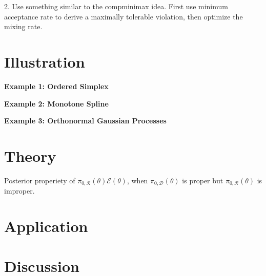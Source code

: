 \documentclass[10pt]{article}
\newcommand{\mc}[1]{\mathcal{#1}}
\begin{document}
2. Use something similar to the compminimax idea. First use minimum acceptance rate to derive a maximally tolerable violation, then optimize the mixing rate. 


\section{Illustration}

{\bf Example 1: Ordered Simplex}

{\bf Example 2: Monotone Spline} 

{\bf Example 3: Orthonormal Gaussian Processes} 

\section{Theory}

Posterior properiety of $\pi_{0,\mc R}(\theta) \mc E(\theta)$,  when $\pi_{0,\mc D}(\theta)$ is proper but $\pi_{0,\mc R}(\theta)$ is improper. 

\section{Application}
\section{Discussion}





\end{document}

